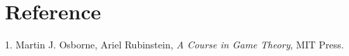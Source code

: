 %
%
%
%
%
%
%
%


\section{Reference}

1. Martin J. Osborne, Ariel Rubinstein, {\it A Course in Game Theory}, MIT Press.
